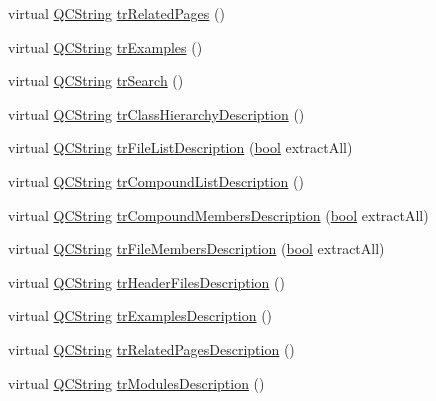 \begin{DoxyCompactItemize}
\item 
virtual \hyperlink{class_q_c_string}{Q\+C\+String} \hyperlink{class_translator_arabic_a08ff492a2101669714711c5f1ba3b732}{tr\+Related\+Pages} ()
\item 
virtual \hyperlink{class_q_c_string}{Q\+C\+String} \hyperlink{class_translator_arabic_a25e1edc62b0483c21294f890cea8d0cb}{tr\+Examples} ()
\item 
virtual \hyperlink{class_q_c_string}{Q\+C\+String} \hyperlink{class_translator_arabic_ac7945d5df6b91d1daa50aeb3b6993231}{tr\+Search} ()
\item 
virtual \hyperlink{class_q_c_string}{Q\+C\+String} \hyperlink{class_translator_arabic_a173d4670408b8048ce49941841f87bc7}{tr\+Class\+Hierarchy\+Description} ()
\item 
virtual \hyperlink{class_q_c_string}{Q\+C\+String} \hyperlink{class_translator_arabic_a04dd144ae8e429fd38839c3a9686c565}{tr\+File\+List\+Description} (\hyperlink{qglobal_8h_a1062901a7428fdd9c7f180f5e01ea056}{bool} extract\+All)
\item 
virtual \hyperlink{class_q_c_string}{Q\+C\+String} \hyperlink{class_translator_arabic_ada3a7c9f4dbbe8ba03053d7686e1355c}{tr\+Compound\+List\+Description} ()
\item 
virtual \hyperlink{class_q_c_string}{Q\+C\+String} \hyperlink{class_translator_arabic_a2ed218e5796759be5e85b7214f8f9d15}{tr\+Compound\+Members\+Description} (\hyperlink{qglobal_8h_a1062901a7428fdd9c7f180f5e01ea056}{bool} extract\+All)
\item 
virtual \hyperlink{class_q_c_string}{Q\+C\+String} \hyperlink{class_translator_arabic_aae7474617581eb79f4fa74169210fc5e}{tr\+File\+Members\+Description} (\hyperlink{qglobal_8h_a1062901a7428fdd9c7f180f5e01ea056}{bool} extract\+All)
\item 
virtual \hyperlink{class_q_c_string}{Q\+C\+String} \hyperlink{class_translator_arabic_a9310846b2565427aaa4fe8a719b97382}{tr\+Header\+Files\+Description} ()
\item 
virtual \hyperlink{class_q_c_string}{Q\+C\+String} \hyperlink{class_translator_arabic_a9447a02d8ff3f92c9836c317d16e9c8c}{tr\+Examples\+Description} ()
\item 
virtual \hyperlink{class_q_c_string}{Q\+C\+String} \hyperlink{class_translator_arabic_a7f2f7f73b53eee9f0aa6564deb009fc9}{tr\+Related\+Pages\+Description} ()
\item 
virtual \hyperlink{class_q_c_string}{Q\+C\+String} \hyperlink{class_translator_arabic_aba7cd02c2d5f051596e1f64b9d6d7037}{tr\+Modules\+Description} ()

\end{DoxyCompactItemize}
